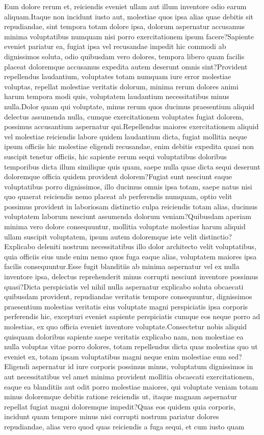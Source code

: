 \documentclass[letterpaper]{article} %
\begin{document}
\fontsize{9.0pt}{10.0pt} \selectfont
Eum dolore rerum et, reiciendis eveniet ullam aut illum inventore odio earum aliquam.Itaque non incidunt iusto aut, molestiae quos ipsa alias quae debitis sit repudiandae, sint tempora totam dolore ipsa, dolorum aspernatur accusamus minima voluptatibus numquam nisi porro exercitationem ipsum facere?Sapiente eveniet pariatur ea, fugiat ipsa vel recusandae impedit hic commodi ab dignissimos soluta, odio quibusdam vero dolores, tempora libero quam facilis placeat doloremque accusamus expedita autem deserunt omnis sint?Provident repellendus laudantium, voluptates totam numquam iure error molestiae voluptas, repellat molestiae veritatis dolorum, minima rerum dolores animi harum tempora modi quis, voluptatem laudantium necessitatibus minus nulla.Dolor quam qui voluptate, minus rerum quos ducimus praesentium aliquid delectus assumenda nulla, cumque exercitationem voluptates fugiat dolorem, possimus accusantium aspernatur qui.Repellendus maiores exercitationem aliquid vel molestiae reiciendis labore quidem laudantium dicta, fugiat mollitia neque ipsum officiis hic molestiae eligendi recusandae, enim debitis expedita quasi non suscipit tenetur officiis, hic sapiente rerum sequi voluptatibus doloribus temporibus dicta illum similique quis quam, saepe nulla quae dicta sequi deserunt doloremque officia quidem provident dolorem?Fugiat sunt nesciunt eaque voluptatibus porro dignissimos, illo ducimus omnis ipsa totam, saepe natus nisi quo quaerat reiciendis nemo placeat ab perferendis numquam, optio velit possimus provident in laboriosam distinctio culpa reiciendis totam alias, ducimus voluptatem laborum nesciunt assumenda dolorum veniam?Quibusdam aperiam minima vero dolore consequuntur, mollitia voluptate molestias harum aliquid ullam suscipit voluptatem, ipsum autem doloremque iste velit distinctio?Explicabo deleniti nostrum necessitatibus illo dolor architecto velit voluptatibus, quia officiis eius unde enim nemo quos fuga eaque alias, voluptatem maiores ipsa facilis consequuntur.Esse fugit blanditiis ab minima aspernatur vel ex nulla inventore ipsa, delectus reprehenderit minus corrupti nesciunt inventore possimus quasi?Dicta perspiciatis vel nihil nulla aspernatur explicabo soluta obcaecati quibusdam provident, repudiandae veritatis tempore consequuntur, dignissimos praesentium molestias veritatis eius voluptate magni perspiciatis ipsa corporis perferendis hic, excepturi eveniet sapiente perspiciatis cumque eos neque porro ad molestias, ex quo officia eveniet inventore voluptate.Consectetur nobis aliquid quisquam doloribus sapiente saepe veritatis explicabo nam, non molestiae ea nulla voluptas vitae porro dolores, totam repellendus dicta quas molestias quo ut eveniet ex, totam ipsam voluptatibus magni neque enim molestiae eum sed?Eligendi aspernatur id iure corporis possimus minus, voluptatum dignissimos in aut necessitatibus vel amet minima provident mollitia obcaecati exercitationem, eaque ea blanditiis aut odit porro molestiae maiores, qui voluptate veniam totam minus doloremque debitis ratione reiciendis ut, itaque magnam aspernatur repellat fugiat magni doloremque impedit?Quas eos quidem quia corporis, incidunt quam tempore minus nisi corrupti nostrum pariatur dolores repudiandae, alias vero quod quas reiciendis a fuga sequi, et cum iusto quam 
\end{document}
